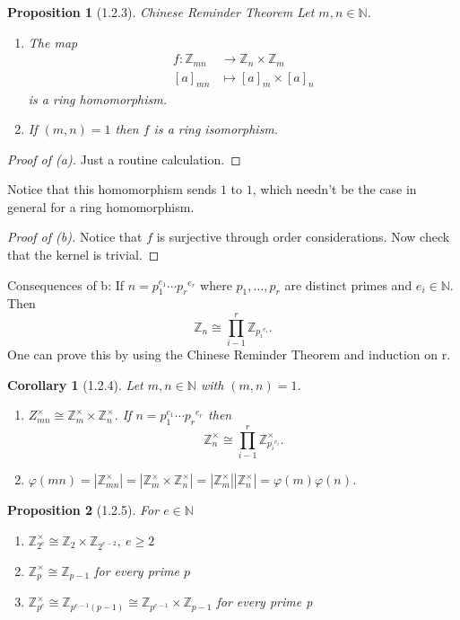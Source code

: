 \documentclass[11pt,leqno,oneside]{amsart}
\newcommand{\N}{{\mathbb N}} %
\newcommand{\Z}{{\mathbb Z}} %
\newcommand{\isom}{\mathrel{\cong}}
\newcommand{\primedecomposition}[3]{#1_1^{#2_1} \cdots {#1_{#3}}^{#2_{#3}}}
\newtheorem*{prop*}{Proposition}
\newtheorem*{cor*}{Corollary}
\theoremstyle{definition}
\numberwithin{equation}{section}
\begin{document}
\begin{prop*}[1.2.3]{Chinese Reminder Theorem}
  Let \(m,n \in \N\).
  \begin{enumerate}
  \item[(a)] The map
    \begin{align*}
      f \colon \Z_{mn} &\to \Z_n \times \Z_m\\
      [a]_{mn}&\mapsto [a]_m \times [a]_n
    \end{align*}
    is a ring homomorphism.
  \item[(b)] If \((m,n)=1\) then \(f\) is a ring isomorphism.
  \end{enumerate}
\end{prop*}
\begin{proof}[Proof of (a)]
  Just a routine calculation.
\end{proof}
Notice that this homomorphism sends \(1\) to \(1\), which needn't be the case in
general for a ring homomorphism.
\begin{proof}[Proof of (b)]
  Notice that \(f\) is surjective through order considerations. Now check that
  the kernel is trivial.
\end{proof}
Consequences of b: If \(n=\primedecomposition{p}{e}{r}\) where
\(p_1,\ldots,p_r\) are distinct primes and \(e_i \in \N\). Then
\[\Z_n \isom \prod_{i-1}^r \Z_{{p_i}^{e_i}}.\]
One can prove this by using the Chinese Reminder Theorem and induction on r.
\begin{cor*}[1.2.4]
  Let \(m,n \in \N\) with \((m,n)=1\).
  \begin{enumerate}
  \item[(a)] \(Z_{mn}^\times \isom \Z_m^\times \times \Z_n^\times\). If
    \(n=\primedecomposition{p}{e}{r}\) then
    \[\Z_n^\times \isom \prod_{i-1}^r \Z^\times_{{p_i}^{e_i}}.\]
  \item[(b)]
    \(\varphi(mn)=|\Z_{mn}^\times|=|\Z_{m}^\times\times
    \Z_{n}^\times|=|\Z_{m}^\times||\Z_{n}^\times|=\varphi(m)\varphi(n)\).
  \end{enumerate}
\end{cor*}
\begin{prop*}[1.2.5]
  For \(e \in \N\)
  \begin{enumerate}
    \item[(a)] \(\Z_{2^e}^\times \isom \Z_2 \times \Z_{2^{e-2}},\ e \ge 2\)
    \item[(b)] \(\Z_p^\times \isom \Z_{p-1}\) for every prime \(p\)
    \item[(c)] \(\Z_{p^e}^\times \isom \Z_{p^{e-1}(p-1)} \isom \Z_{p^{e-1}} \times \Z_{p-1} \) for every prime p
  \end{enumerate}
\end{prop*}
\end{document}
